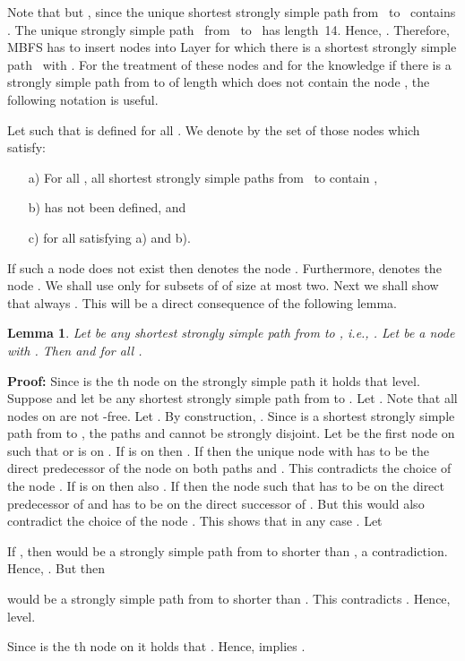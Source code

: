 \documentclass[12pt,twoside,a4paper]{article}
\def\QED{\hbox{\hskip 1pt \vrule width4pt height 6pt depth 1.5pt \hskip 1pt}}
\newtheorem{lemma}{Lemma}
\begin{document}
Note that  but , 
since the unique shortest strongly simple path from~ to~
contains . The unique strongly simple path~ from~ to~
has length~14. Hence, . Therefore, MBFS has to insert nodes 
 into Layer  for which there is a shortest 
strongly simple path~ with 
. For the treatment of these nodes and for the knowledge if
there is a strongly simple path from  to  of length  which does
not contain the node , the following notation is useful.

Let  such that  is defined for all .
We denote by  the set of those nodes 
 which satisfy:
\begin{itemize}
\item[a)] For all , all shortest strongly simple paths from~ to
 contain ,
\item[b)]  has not been defined, and
\item[c)]  for all  satisfying a) and b).
\end{itemize}
If such a node  does not exist then  denotes the node .
Furthermore,  denotes the node .
We shall use  only for subsets  of  of size at most two.
Next we shall show that always . 
This will be a direct consequence of the following lemma.
\begin{lemma} \label{hk1}
Let  be any shortest strongly simple
path from  to , i.e., . Let  be a node with . Then  
and  for all .
\end{lemma}
{\bf Proof:} 
Since  is the th node on the strongly simple path  it holds that
level.
Suppose  and let  be any shortest strongly simple path
from  to . Let . 
Note that all nodes on  are not -free. Let .
By construction, . Since  is a shortest strongly simple path from  
to , the paths  and  cannot be strongly disjoint. Let  be the
first node on  such that  or  is on . 
If  is on  then . If  then the unique node  with
 has to be the direct predecessor of the node  on both 
paths  and . This contradicts the choice of the node . 
If  is on  then also . If  then the node  
such that  has to be on  the direct predecessor of  
and  has to be on  the direct successor of .
But this would also contradict the choice of the node . This shows
that in any case . Let

If , then  would be a strongly 
simple path from  to  shorter than , a contradiction. 
Hence, . But then

would be a strongly simple path from  to  shorter than . This
contradicts . Hence, level.

Since  is the th node on  it holds that .
Hence,  implies .
\QED
\end{document}

